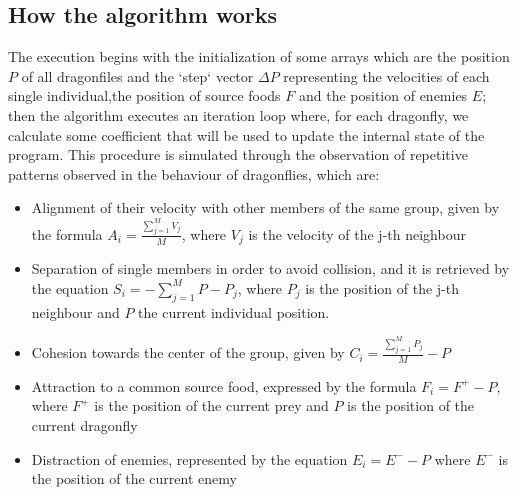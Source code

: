 \documentclass[10pt]{article}
\begin{document}
\begin{multicols}{2}
\subsection*{How the algorithm works}
The execution begins with the initialization of some arrays which are the position $P$ of all dragonfiles and the `step` vector $\Delta P$ representing the velocities of each single individual,the position of source foods $F$ and the position of enemies $E$; then the algorithm executes an iteration loop where, for each dragonfly, we calculate some coefficient that will be used to update the internal state of the program. This procedure is simulated through the observation of repetitive patterns observed in the behaviour of dragonflies, which are:



\begin{itemize}
  \item Alignment of their velocity with other members of the same group, given by the formula  $A_i = \frac{\sum^M_{j=1}V_j}{M}$, where $V_j$ is the velocity of the j-th neighbour

  \item Separation of single members in order to avoid collision, and it is retrieved by the equation  $S_i = - \sum^M_{j=1}{P - P_j}$, where $P_j$ is the position of the j-th neighbour and $P$ the current individual position.
    
  \item Cohesion towards the center of the group, given by $C_i = \frac{\sum^M_{j=1}P_j}{M} - P$ 
  \item Attraction to a common source food, expressed by the formula $ F_i = F^+ - P$, where $F^+$ is the position of the current prey and $P$ is the position of the current dragonfly
  \item Distraction of enemies, represented by the equation $ E_i = E^- - P$ where $E^-$ is the position of the current enemy 
\end{itemize}


\end{multicols}
\end{document}
